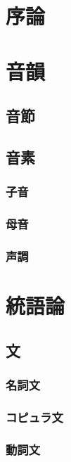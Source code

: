 \section{序論}
\newpage

\section{音韻}
\subsection{音節}
\subsection{音素}
\subsubsection{子音}
\subsubsection{母音}
\subsubsection{声調}
\newpage

\section{統語論}
\subsection{文}
\subsubsection{名詞文}
\subsubsection{コピュラ文}
\subsubsection{動詞文}
